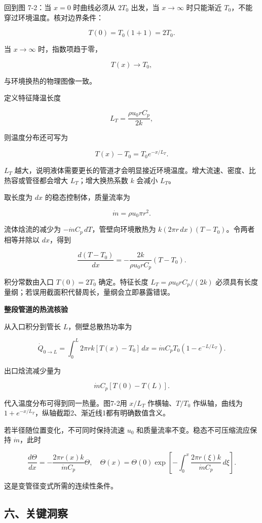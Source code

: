 \documentclass[12pt,a4paper,UTF8]{ctexart}
\begin{document}
回到图 7-2：当 \(x=0\) 时曲线必须从 \(2T_0\) 出发，当 \(x\to\infty\)
时只能渐近 \(T_0\)，不能穿过环境温度。核对边界条件：

\[T(0)=T_0(1+1)=2T_0.\]

当 \(x\to\infty\) 时，指数项趋于零，

\[T(x)\to T_0,\]

与环境换热的物理图像一致。

定义特征降温长度

\[L_T=\frac{\rho u_0rC_p}{2k},\]

则温度分布还可写为

\[T(x)-T_0=T_0e^{-x/L_T}.\]

\(L_T\)
越大，说明液体需要更长的管道才会明显接近环境温度。增大流速、密度、比热容或管径都会增大
\(L_T\)；增大换热系数 \(k\) 会减小 \(L_T\)。

取长度为 \(dx\) 的稳态控制体，质量流率为

\[\dot m=\rho u_0\pi r^2.\]

流体焓流的减少为 \(-\dot m C_p\,dT\)，管壁向环境散热为
\(k(2\pi r\,dx)(T-T_0)\)。令两者相等并除以 \(dx\)，得到

\[\frac{d(T-T_0)}{dx}=-\frac{2k}{\rho u_0rC_p}(T-T_0).\]

积分常数由入口 \(T(0)=2T_0\) 确定。特征长度 \(L_T=\rho u_0rC_p/(2k)\)
必须具有长度量纲；若误用截面积代替周长，量纲会立即暴露错误。

\textbf{整段管道的热流核验}

从入口积分到管长 \(L\)，侧壁总散热功率为

\[\dot Q_{0\to L}=\int_0^L2\pi rk[T(x)-T_0]\,dx
=\dot m C_pT_0(1-e^{-L/L_T}).\]

出口焓流减少量为

\[\dot mC_p[T(0)-T(L)].\]

代入温度分布可得到同一热量。图7-2用 \(x/L_T\) 作横轴、\(T/T_0\)
作纵轴，曲线为 \(1+e^{-x/L_T}\)，纵轴截距2、渐近线1都有明确数值含义。

若半径随位置变化，不可同时保持流速 \(u_0\)
和质量流率不变。稳态不可压缩流应保持 \(\dot m\)，此时

\[\frac{d\Theta}{dx}=-\frac{2\pi r(x)k}{\dot mC_p}\Theta,\quad
\Theta(x)=\Theta(0)\exp\left[-\int_0^x\frac{2\pi r(\xi)k}{\dot mC_p}\,d\xi\right].\]

这是变管径变式所需的连续性条件。

\subsection{六、关键洞察}\label{ux516dux5173ux952eux6d1eux5bdf-6}
\end{document}
